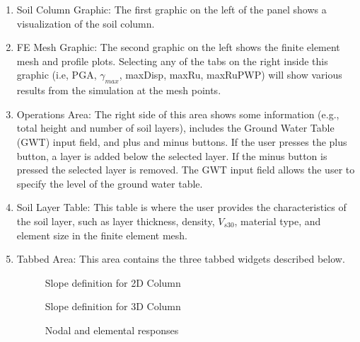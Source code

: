 \begin{enumerate}
\item Soil Column Graphic: The first graphic on the left of the panel shows a visualization of the soil column.
\item FE Mesh Graphic: The second graphic on the left shows 
the finite element mesh and profile plots. Selecting any of the tabs on the right inside this graphic (i.e, PGA, $\gamma_{max}$, maxDisp, maxRu, maxRuPWP) will show various results
from the simulation at the mesh points.
\item Operations Area: The right side of this area shows some information (e.g., total height and number of soil layers), includes the Ground Water Table (GWT) input field, and plus and minus buttons. 
If the user presses the plus button, a layer is added below the selected layer. If the minus button is pressed the selected layer is removed. The GWT input field allows the user to specify the level of the ground water table.
\item Soil Layer Table: This table is where the user provides the characteristics of the soil layer, such as layer thickness, density, $V_{s30}$, material type, and element size in the finite element mesh.
\item Tabbed Area: This area contains the three tabbed widgets described below.

\begin{figure}[!htbp]
  \caption{Slope definition for 2D Column }
  \label{fig:slope2D}
\end{figure}


\begin{figure}[!htbp]
  \caption{Slope definition for 3D Column}
  \label{fig:slope3D}
\end{figure}


\begin{figure}[!htbp]
  \caption{Nodal and elemental responses}
  \label{fig:response}
\end{figure}


\end{enumerate}
